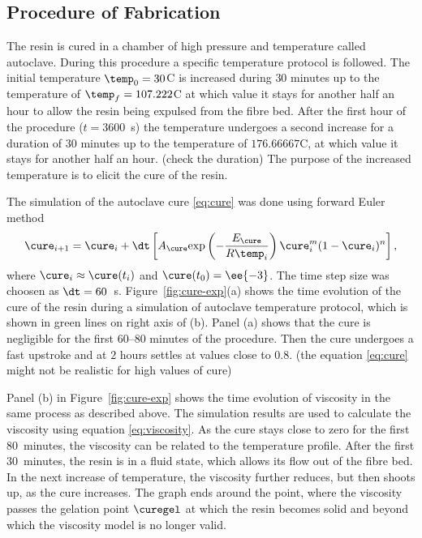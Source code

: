 \documentclass[twoside,a4paper,12pt,draft]{article}
\newcommand{\figref}[1]{Figure~\ref{#1}}
\newcommand{\note}[1]{{\color{red}(#1)}}
\newcommand{\note}[1]{}
\begin{document}
\subsection{Procedure of Fabrication}

The resin is cured in a chamber of high pressure and temperature
called autoclave. During this procedure a specific temperature
protocol is followed.  The initial temperature $\temp_0 = 30$\degree C is
increased during $30$ minutes up to the temperature of
$\temp_f = 107.222$\degree C at which value it stays for another half an
hour to allow the resin being expulsed from the fibre bed. After the
first hour of the procedure ($t=3600$~s) the temperature undergoes a
second increase for a duration of $30$ minutes up to the temperature
of $176.66667$\degree C, at which value it stays for another half an
hour. \note{check the duration} The purpose of the increased
temperature is to elicit the cure of the resin.

The simulation of the autoclave cure \eqref{eq:cure} was done using
forward Euler method
%
\begin{align}
  \cure_{i+1} =    \cure_i + \dt \left[A_\cure \exp{-\frac{E_\cure }{R\temp_i}} \cure_i^m (1-\cure_i)^n\right], \label{eq:cure-fe}
\end{align}
%
where $\cure_i \approx \cure(t_i)$ and $\cure(t_0)=\ee{-3}$. The
time step size was choosen as $\dt = 60$~s.
%
\figref{fig:cure-exp}(a) shows the time evolution of the cure of the
resin during a simulation of autoclave temperature protocol, which is
shown in green lines on right axis of (b).  Panel (a) shows that the
cure is negligible for the first $60$--$80$ minutes of the
procedure. Then the cure undergoes a fast upstroke and at $2$ hours
settles at values close to $0.8$.
%
\note{the equation \eqref{eq:cure} might not be realistic for high values of cure}

Panel (b) in \figref{fig:cure-exp} shows the time evolution of
viscosity in the same process as described above. The simulation
results are used to calculate the viscosity using equation
\eqref{eq:viscosity}. As the cure stays close to zero for the first
$80$~minutes, the viscosity can be related to the temperature
profile. After the first $30$~minutes, the resin is in a fluid state,
which allows its flow out of the fibre bed. In the next increase of
temperature, the viscosity further reduces, but then shoots up, as the
cure increases. The graph ends around the point, where the viscosity
passes the gelation point $\curegel$ at which the resin becomes solid
and beyond which the viscosity model is no longer valid.
\end{document}
